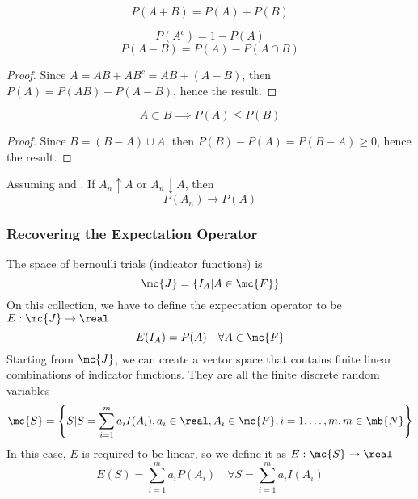 \documentclass[11pt]{article}
\numberwithin{equation}{section}
\begin{document}
$$P(A + B) = P(A) + P(B)$$

\corollary[complementarity]
$$P(A^c) = 1 - P(A)$$
$$P(A - B) = P(A) - P(A\cap B)$$
\begin{proof}
	Since $A = AB + AB^c = AB + (A-B)$, then $P(A) = P(AB) + P(A-B)$, hence the result.
\end{proof}

\corollary[monotonicity]
$$A \subset B \implies P(A) \leq P(B)$$
\begin{proof}
	Since $B = (B - A) \cup A$, then $P(B) - P(A) = P(B - A) \geq 0$, hence the result.
\end{proof}

\proposition
Assuming  and . If $A_n \uparrow A$ or $A_n \downarrow A$, then
$$P(A_n) \rightarrow P(A)$$

\subsubsection{Recovering the Expectation Operator}
The space of bernoulli trials (indicator functions) is
$$ \mc{J} = \{I_A | A \in \mc{F}\}$$
On this collection, we have to define the expectation operator to be $E: \mc{J} \rightarrow \real$
$$E(I_A) = P(A) \quad \forall A \in \mc{F}$$
Starting from $\mc{J}$, we can create a vector space that contains finite linear combinations of indicator functions. They are all the finite discrete random variables
$$\mc{S} = \left \{ S | S = \sum_{i=1}^m a_i I(A_i), a_i \in \real, A_i \in \mc{F}, i = 1, \hdots, m, m \in \mb{N} \right\}$$
In this case, $E$ is required to be linear, so we define it as $E: \mc{S} \rightarrow \real$
$$ E(S) = \sum_{i=1}^m a_iP(A_i) \quad \forall S = \sum_{i=1}^m a_iI(A_i)$$
\end{document}
